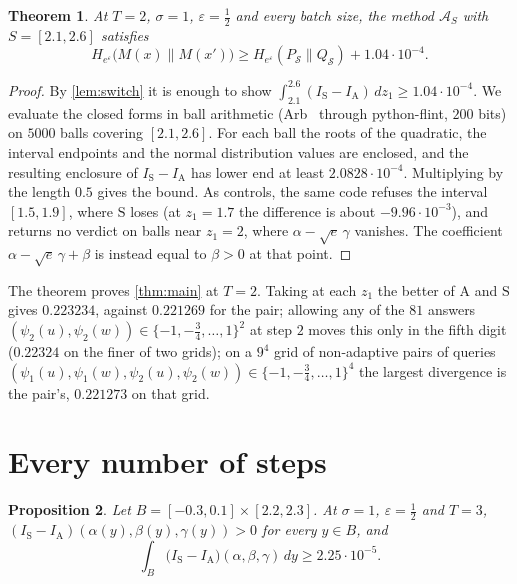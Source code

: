 \documentclass[11pt]{amsart}
\newtheorem{theorem}{Theorem}[section]
\newtheorem{proposition}[theorem]{Proposition}
\theoremstyle{definition}
\theoremstyle{remark}
\newcommand{\ANTI}{\mathrm{A}}
\newcommand{\SAME}{\mathrm{S}}
\newcommand{\He}{H_{e^{\varepsilon}}}
\begin{document}
\begin{theorem}\label{thm:T2}
At $T=2$, $\sigma=1$, $\varepsilon=\frac12$ and every batch size, the method $\mathcal A_S$ with $S=[2.1,2.6]$ satisfies
\[
\He\bigl(M(x)\|M(x')\bigr)\ge\He(P_{\mathcal S}\|Q_{\mathcal S})+1.04\cdot10^{-4}.
\]
\end{theorem}

\begin{proof}
By \cref{lem:switch} it is enough to show $\int_{2.1}^{2.6}(I_{\SAME}-I_{\ANTI})\,dz_1\ge1.04\cdot10^{-4}$. We evaluate the closed forms in ball arithmetic (Arb~\cite{Joh17} through python-flint, $200$ bits) on $5000$ balls covering $[2.1,2.6]$. For each ball the roots of the quadratic, the interval endpoints and the normal distribution values are enclosed, and the resulting enclosure of $I_{\SAME}-I_{\ANTI}$ has lower end at least $2.0828\cdot10^{-4}$. Multiplying by the length $0.5$ gives the bound. As controls, the same code refuses the interval $[1.5,1.9]$, where $\SAME$ loses (at $z_1=1.7$ the difference is about $-9.96\cdot10^{-3}$), and returns no verdict on balls near $z_1=2$, where $\alpha-\sqrt e\,\gamma$ vanishes. The coefficient $\alpha-\sqrt e\,\gamma+\beta$ is instead equal to $\beta>0$ at that point.
\end{proof}

The theorem proves \cref{thm:main} at $T=2$. Taking at each $z_1$ the better of $\ANTI$ and $\SAME$ gives $0.223234$, against $0.221269$ for the pair; allowing any of the $81$ answers $(\psi_2(u),\psi_2(w))\in\{-1,-\frac34,\dots,1\}^2$ at step $2$ moves this only in the fifth digit ($0.22324$ on the finer of two grids); on a $9^4$ grid of non-adaptive pairs of queries $(\psi_1(u),\psi_1(w),\psi_2(u),\psi_2(w))\in\{-1,-\frac34,\dots,1\}^4$ the largest divergence is the pair's, $0.221273$ on that grid.

\section{Every number of steps}\label{sec:allT}

\begin{proposition}\label{prop:T3}
Let $B=[-0.3,0.1]\times[2.2,2.3]$. At $\sigma=1$, $\varepsilon=\frac12$ and $T=3$, $(I_{\SAME}-I_{\ANTI})(\alpha(y),\beta(y),\gamma(y))>0$ for every $y\in B$, and
\[
\int_B\bigl(I_{\SAME}-I_{\ANTI}\bigr)(\alpha,\beta,\gamma)\,dy\ge2.25\cdot10^{-5}.
\]
\end{proposition}
\end{document}
